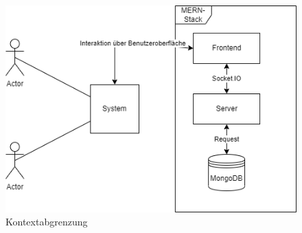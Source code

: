 \documentclass[conference]{IEEEtran}
\begin{document}
\begin{figure}[htbp]
\centering
\includegraphics[scale=0.35]{Kontextabgrenzung.png}
\caption{Kontextabgrenzung}%
\end{figure}
\end{document}
